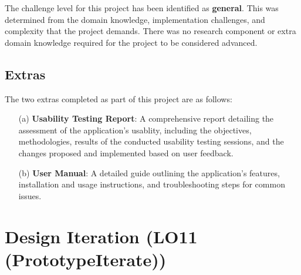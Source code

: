 \documentclass{article}
\begin{document}
The challenge level for this project has been identified as \textbf{general}.
This was determined from the domain knowledge, implementation challenges, and
complexity that the project demands. There was no research component or extra
domain knowledge required for the project to be considered advanced.

\subsection{Extras}

The two extras completed as part of this project are as follows:
\begin{itemize}
    \item[(a)] \textbf{Usability Testing Report}: A comprehensive report
    detailing the assessment of the application's usablity, including the
    objectives, methodologies, results of the conducted usability testing
    sessions, and the changes proposed and implemented based on user feedback.
    \item[(b)] \textbf{User Manual}: A detailed guide outlining the
    application's features, installation and usage instructions, and
    troubleshooting steps for common issues.
\end{itemize}


\section{Design Iteration (LO11 (PrototypeIterate))}

\end{document}
